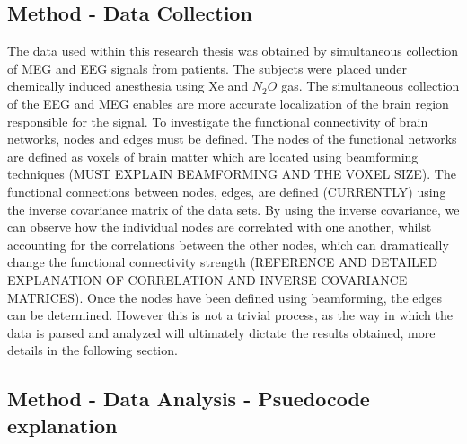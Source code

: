 \documentclass{article}
\begin{document}
\subsection{Method - Data Collection}
The data used within this research thesis was obtained by simultaneous collection of MEG and EEG signals from patients. The subjects were placed under chemically induced anesthesia using Xe and $N_2 O$ gas. The simultaneous collection of the EEG and MEG enables are more accurate localization of the brain region responsible for the signal. To investigate the functional connectivity of brain networks, nodes and edges must be defined. The nodes of the functional networks are defined as voxels of brain matter which are located using beamforming techniques (MUST EXPLAIN BEAMFORMING AND THE VOXEL SIZE). The functional connections between nodes, edges, are defined (CURRENTLY) using the inverse covariance matrix of the data sets. By using the inverse covariance, we can observe how the individual nodes are correlated with one another, whilst accounting for the correlations between the other nodes, which can dramatically change the functional  connectivity strength (REFERENCE AND DETAILED EXPLANATION OF CORRELATION AND INVERSE COVARIANCE MATRICES). Once the nodes have been defined using beamforming, the edges can be determined. However this is not a trivial process, as the way in which the data is parsed  and analyzed will ultimately dictate the results obtained, more details in the following section.

\subsection{Method - Data Analysis - Psuedocode explanation}
\end{document}
